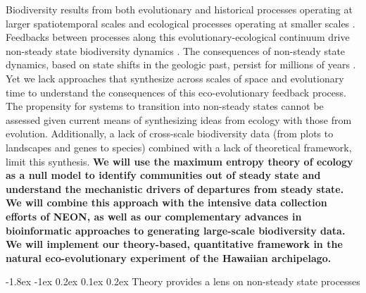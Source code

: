 \documentclass[11pt]{article}
\makeatletter
\renewcommand\subsection{\@startsection{subsection}{1}{\z@}%
                                  {-1.8ex \@plus -1ex \@minus 0.2ex}%
                                  {0.1ex \@plus 0.2ex}%
                                  {\normalfont\large\bfseries}}
\makeatother
\begin{document}
Biodiversity results from both evolutionary and historical processes
operating at larger spatiotemporal scales and ecological processes
operating at smaller scales \citep{lessard2012}.  Feedbacks between
processes along this evolutionary-ecological continuum drive
non-steady state biodiversity dynamics \citep{brown1971,
  ricklefs2006neutral, rominger2015}. The consequences of non-steady
state dynamics, based on state shifts in the geologic past, persist
for millions of years \citep{Erwin1998}. Yet we lack approaches that
synthesize across scales of space and evolutionary time to understand
the consequences of this eco-evolutionary feedback process.  The
propensity for systems to transition into non-steady states cannot be
assessed given current means of synthesizing ideas from ecology with
those from evolution.  Additionally, a lack of cross-scale
biodiversity data (from plots to landscapes and genes to species)
combined with a lack of theoretical framework, limit this synthesis.
{\bf We will use the maximum entropy theory of ecology
  \citep[METE;][]{harte2011} as a null model to identify communities
  out of steady state and understand the mechanistic drivers of
  departures from steady state.  We will combine this approach with
  the intensive data collection efforts of NEON, as well as our
  complementary advances in bioinformatic approaches to generating
  large-scale biodiversity data. We will implement our theory-based,
  quantitative framework in the natural eco-evolutionary experiment of
  the Hawaiian archipelago.}


\subsection{Theory provides a lens on non-steady state processes}
\end{document}
